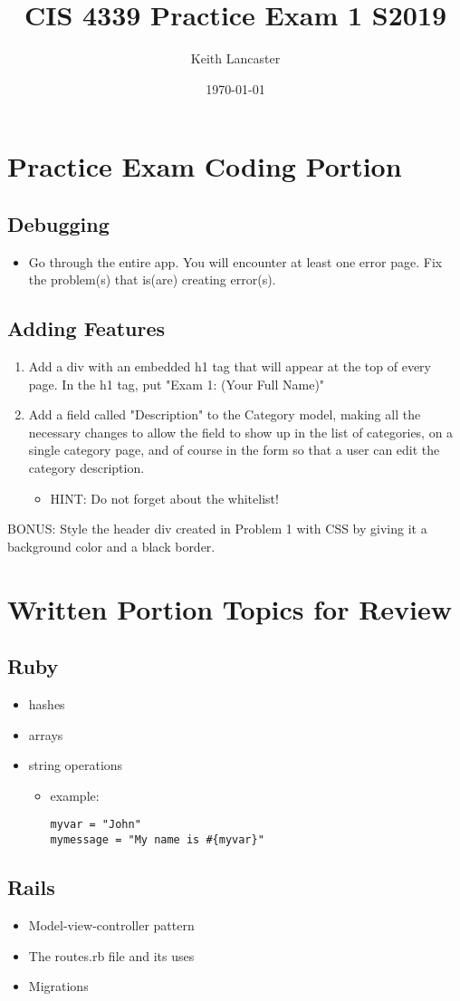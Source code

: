 \documentclass[11pt]{article}
\author{Keith Lancaster}
\date{\today}
\title{CIS 4339 Practice Exam 1 S2019}
\begin{document}
\maketitle


\section*{Practice Exam Coding Portion}
\label{sec:orgb437057}
\subsection*{Debugging}
\label{sec:orgca5b745}
\begin{itemize}
\item Go through the entire app. You will encounter at least one error page. Fix the problem(s) that is(are) creating error(s).
\end{itemize}
\subsection*{Adding Features}
\label{sec:orgb12546b}
\begin{enumerate}
\item Add a div with an embedded h1 tag that will appear at the top of every page. In the h1 tag, put "Exam 1: (Your Full Name)"
\item Add a field called "Description" to the Category model, making all the
necessary changes to allow the field to show up in the list of categories,
on a single category page, and of course in the form so that a user can
edit the category description.
\begin{itemize}
\item HINT: Do not forget about the whitelist!
\end{itemize}
\end{enumerate}

BONUS: Style the header div created in Problem 1 with CSS by giving it a background color and a black border. 

\section*{Written Portion Topics for Review}
\label{sec:org335857e}
\subsection*{Ruby}
\label{sec:org92cf6e9}
\begin{itemize}
\item hashes
\item arrays
\item string operations
\begin{itemize}
\item example:
\begin{verbatim}
myvar = "John"
mymessage = "My name is #{myvar}"
\end{verbatim}
\end{itemize}
\end{itemize}
\subsection*{Rails}
\label{sec:orgc5999e5}
\begin{itemize}
\item Model-view-controller pattern
\item The routes.rb file and its uses
\item Migrations
\end{itemize}
\end{document}
